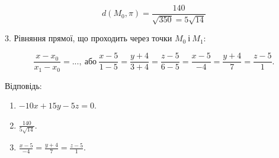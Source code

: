 \documentclass[14pt,draft]{extreport}
\begin{document}
\begin{equation}
	d(M_0,\pi)=\frac{140}{\sqrt{350}=5\sqrt{14}}
\end{equation}

3. Рівняння прямої, що проходить через точки $M_0~\text{і}~M_1$:

\begin{equation}
	\frac{x-x_0}{x_1-x_0}=...,~\text{або}~
	\frac{x-5}{1-5}=\frac{y+4}{3+4}=\frac{z-5}{6-5}=
	\frac{x-5}{-4}=\frac{y+4}{7}=\frac{z-5}{1}.
\end{equation}

\null\hfill
\begin{boxedminipage}{0.33\textwidth}
	Відповідь:
	\begin{enumerate}
		\item $-10x+15y-5z=0$.
		\item $\frac{140}{5\sqrt{14}}$.
		\item $\frac{x-5}{-4}=\frac{y+4}{7}=\frac{z-5}{1}$.
	\end{enumerate}
\end{boxedminipage}
\end{document}
